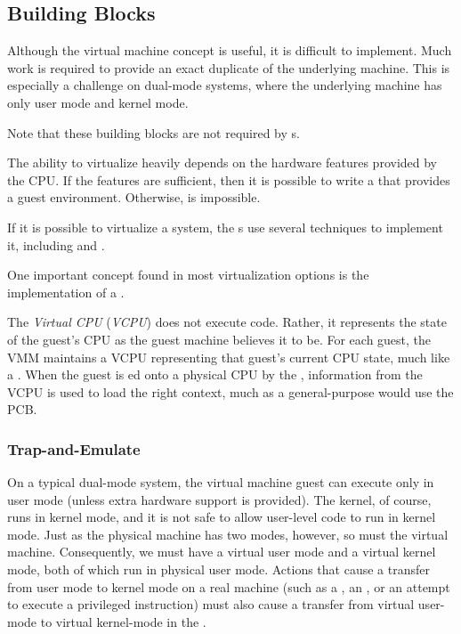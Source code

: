 \subsection{Building Blocks}\label{subsec:Building_Blocks}
Although the virtual machine concept is useful, it is difficult to implement.
Much work is required to provide an exact duplicate of the underlying machine.
This is especially a challenge on dual-mode systems, where the underlying machine has only user mode and kernel mode.

\begin{remark*}
  Note that these building blocks are not required by s.
\end{remark*}

The ability to virtualize heavily depends on the hardware features provided by the CPU.\@
If the features are sufficient, then it is possible to write a  that provides a guest environment.
Otherwise,  is impossible.

If it is possible to virtualize a system, the s use several techniques to implement it, including  and .

One important concept found in most virtualization options is the implementation of a .

\begin{definition}\label{def:Virtual_CPU}\label{def:VCPU}
  The \emph{Virtual CPU} (\emph{VCPU}) does not execute code.
  Rather, it represents the state of the guest's CPU as the guest machine believes it to be.
  For each guest, the VMM maintains a VCPU representing that guest's current CPU state, much like a .
  When the guest is ed onto a physical CPU by the , information from the VCPU is used to load the right context, much as a general-purpose  would use the PCB.\@
\end{definition}

\subsubsection{Trap-and-Emulate}\label{subsubsec:Trap_and_Emulate}
On a typical dual-mode system, the virtual machine guest can execute only in user mode (unless extra hardware support is provided).
The kernel, of course, runs in kernel mode, and it is not safe to allow user-level code to run in kernel mode.
Just as the physical machine has two modes, however, so must the virtual machine.
Consequently, we must have a virtual user mode and a virtual kernel mode, both of which run in physical user mode.
Actions that cause a transfer from user mode to kernel mode on a real machine (such as a , an , or an attempt to execute a privileged instruction) must also cause a transfer from virtual user-mode to virtual kernel-mode in the .

